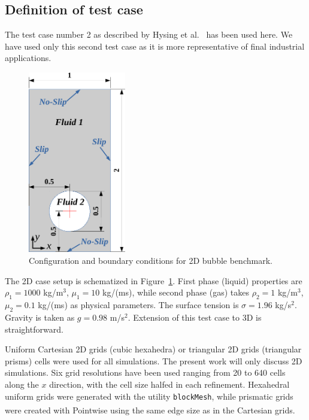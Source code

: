 \documentclass[review]{elsarticle}
\begin{document}
\subsection{Definition of test case}\label{sec_hysingcasedef}
The test case number 2 as described by Hysing et al.~\cite{Hysing2009} has been used here. We have used only this second test case as it is more representative of final industrial applications. 
\begin{figure}[!h]
\begin{center}
 \vspace{-1mm}
 \includegraphics[width=4.25cm]{figures/benchmark_scheme.pdf}
 \vspace{-7mm}
\end{center}
\caption{Configuration and boundary conditions for 2D bubble benchmark.}
\label{benchmark_scheme}
\end{figure}
The 2D case setup is schematized in Figure~\ref{benchmark_scheme}. First phase (liquid) properties are $\rho_1=1000$ kg/m$^3$, $\mu_1=10$ kg/(ms), while second phase (gas) takes $\rho_2=1$ kg/m$^3$, $\mu_2=0.1$ kg/(ms) as physical parameters. The surface tension is $\sigma=1.96$ kg/s$^2$. Gravity is taken as $g=0.98$ m/s$^2$. Extension of this test case to 3D is straightforward.

Uniform Cartesian 2D grids (cubic hexahedra) or triangular 2D grids (triangular prisms) cells were used for all simulations. The present work will only discuss 2D simulations. Six grid resolutions have been used ranging from 20 to 640 cells along the $x$ direction, with the cell size halfed in each refinement. Hexahedral uniform grids were generated with the utility \verb+blockMesh+, while prismatic grids were created with Pointwise\textsuperscript{\textregistered} using the same edge size as in the Cartesian grids. 
\end{document}
